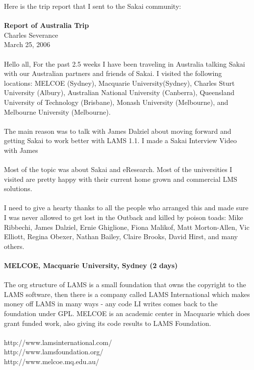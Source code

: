 \documentclass[12pt]{book}
\begin{document}
Here is the trip report that I sent to the Sakai
community:\\
\\
{\bf Report of Australia Trip}\\
Charles Severance\\
March 25, 2006\\
\\
Hello all,   For the past 2.5 weeks I have been traveling in Australia talking Sakai with our Australian partners and friends of Sakai.   I visited the following locations:   MELCOE (Sydney),   Macquarie University(Sydney), Charles Sturt University (Albury), Australian National University (Canberra), Queensland University of Technology (Brisbane), Monash University (Melbourne), and Melbourne University (Melbourne).  \\
\\
The main reason was to talk with James Dalziel about moving forward and getting Sakai to work better with LAMS 1.1.    I made a Sakai Interview Video with James\\
\\
Most of the topic was about Sakai and eResearch.   Most of the universities I visited are pretty happy with their current home grown and commercial LMS solutions.\\
\\
I need to give a hearty thanks to all the people who arranged this and made sure I was never allowed to get lost in the Outback and killed by poison toads: Mike Ribbechi, James Dalziel,   Ernie Ghiglione, Fiona Malikof, Matt Morton-Allen, Vic Elliott, Regina Obexer, Nathan Bailey, Claire Brooks,   David Hirst, and many others.\\
\\
{\bf MELCOE, Macquarie University, Sydney (2 days)}\\
\\
The org structure of LAMS is a small foundation that owns the copyright to the LAMS software, then there is a company called LAMS International which makes money off LAMS in many ways - any code LI writes comes back to the foundation under GPL. MELCOE is an academic center in Macquarie which does grant funded work, also giving its code results to LAMS Foundation.     \\
\\
http://www.lamsinternational.com/\\
http://www.lamsfoundation.org/\\
http://www.melcoe.mq.edu.au/\\
\end{document}
